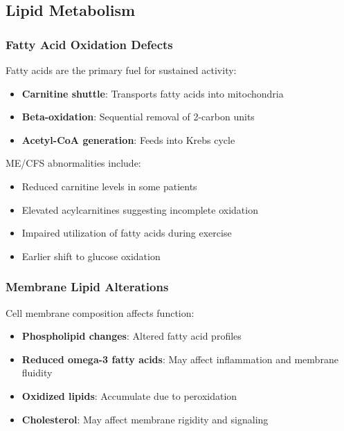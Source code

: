\subsection{Lipid Metabolism}
\label{sec:lipid-metabolism}

\subsubsection{Fatty Acid Oxidation Defects}

Fatty acids are the primary fuel for sustained activity:

\begin{itemize}
    \item \textbf{Carnitine shuttle}: Transports fatty acids into mitochondria
    \item \textbf{Beta-oxidation}: Sequential removal of 2-carbon units
    \item \textbf{Acetyl-CoA generation}: Feeds into Krebs cycle
\end{itemize}

ME/CFS abnormalities include:
\begin{itemize}
    \item Reduced carnitine levels in some patients
    \item Elevated acylcarnitines suggesting incomplete oxidation
    \item Impaired utilization of fatty acids during exercise
    \item Earlier shift to glucose oxidation
\end{itemize}

\subsubsection{Membrane Lipid Alterations}

Cell membrane composition affects function:

\begin{itemize}
    \item \textbf{Phospholipid changes}: Altered fatty acid profiles
    \item \textbf{Reduced omega-3 fatty acids}: May affect inflammation and membrane fluidity
    \item \textbf{Oxidized lipids}: Accumulate due to peroxidation
    \item \textbf{Cholesterol}: May affect membrane rigidity and signaling
\end{itemize}

